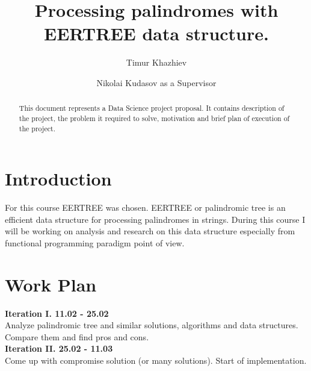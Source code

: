 \documentclass[sigconf]{acmart}
\begin{document}
%
\title{Processing palindromes with EERTREE data structure.}

%
\author{Timur Khazhiev}

\author{Nikolai Kudasov as a Supervisor}


%
\begin{abstract}
This document represents a Data Science project proposal. It contains description of the project, the problem it required to solve, motivation and brief plan of execution of the project.
\end{abstract}


%
\maketitle

\section{Introduction}
For this course EERTREE was chosen. EERTREE or palindromic tree is an efficient data structure for processing palindromes in strings. During this course I will be working on analysis and research on this data structure especially from functional programming paradigm point of view.

\section{Work Plan}
\par
\textbf{Iteration I. 11.02 - 25.02}\\
Analyze palindromic tree and similar solutions, algorithms and data structures. Compare them and find pros and cons.\\

\textbf{Iteration II. 25.02 - 11.03}\\
Come up with compromise solution (or many solutions). Start of  implementation. \\
\end{document}

